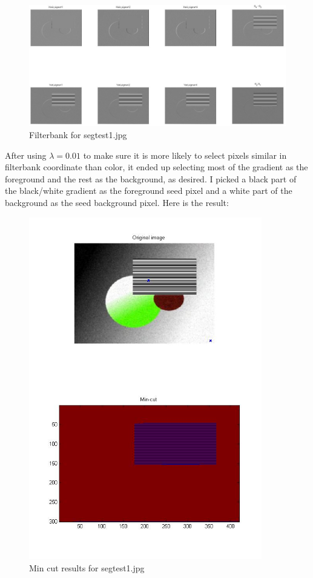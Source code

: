 \documentclass[11pt,psfig]{article}
\begin{document}
\begin{figure}[H]
\centering
\includegraphics[width=7in]{prob5plotB_2_filter.jpg}
\caption{Filterbank for segtest1.jpg}
\end{figure}

After using $\lambda=0.01$ to make sure it is more likely to select pixels similar in filterbank coordinate than color, it ended up selecting most of the gradient as the foreground and the rest as the background, as desired. I picked a black part of the black/white gradient as the foreground seed pixel and a white part of the background as the seed background pixel. Here is the result:

\begin{figure}[H]
\centering
\includegraphics[width=4in]{prob5plotB_2.jpg}
\caption{Min cut results for segtest1.jpg}
\end{figure}
\end{document}
